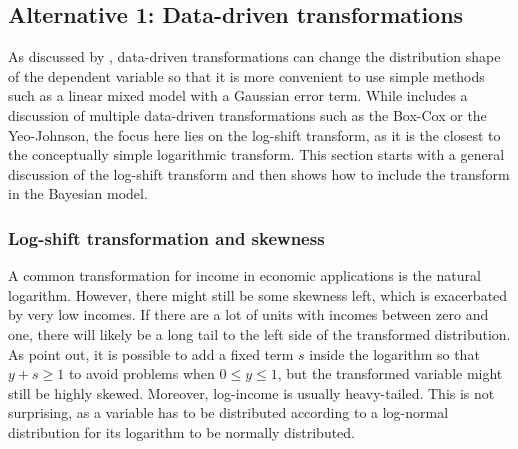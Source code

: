 \subsection{Alternative 1: Data-driven transformations}
\label{ch:log_shift}

As discussed by \cite{rojas_perilla_data_2020}, data-driven transformations can change the distribution shape of the dependent variable so that it is more convenient to use simple methods such as a linear mixed model with a Gaussian error term.
While \cite{rojas_perilla_data_2020} includes a discussion of multiple data-driven transformations such as the Box-Cox or the Yeo-Johnson, the focus here lies on the log-shift transform, as it is the closest to the conceptually simple logarithmic transform.
This section starts with a general discussion of the log-shift transform and then shows how to include the transform in the Bayesian model.

\subsubsection{Log-shift transformation and skewness}
A common transformation for income in economic applications is the natural logarithm. However, there might still be some skewness left, which is exacerbated by very low incomes.
If there are a lot of units with incomes between zero and one, there will likely be a long tail to the left side of the transformed distribution.
As \cite{rojas_perilla_data_2020} point out, it is possible to add a fixed term $s$ inside the logarithm so that $y+s \ge 1$ to avoid problems when $0 \le y \le 1$,
but the transformed variable might still be highly skewed.
Moreover, log-income is usually heavy-tailed.
This is not surprising, as a variable has to be distributed according to a log-normal distribution for its logarithm to be normally distributed.

